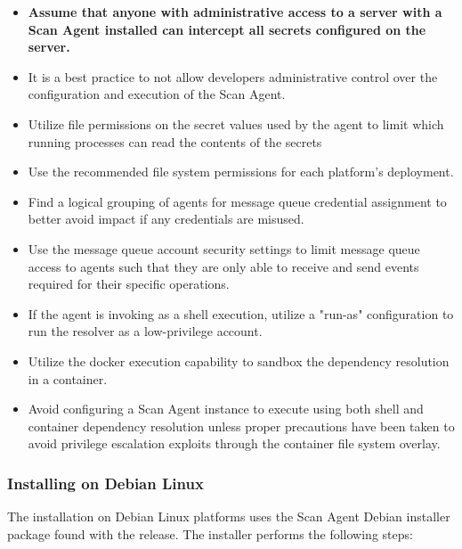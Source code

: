 \begin{itemize}
  \item \textbf{Assume that anyone with administrative access to a server with a Scan Agent installed
    can intercept all secrets configured on the \cxoneflow server.}
  \item It is a best practice to not allow developers administrative control over the configuration and
    execution of the Scan Agent.
  \item Utilize file permissions on the secret values used by the agent to limit which running processes
    can read the contents of the secrets
  \item Use the recommended file system permissions for each platform's deployment.
  \item Find a logical grouping of agents for message queue credential assignment to better avoid
    impact if any credentials are misused.
  \item Use the message queue account security settings to limit message queue access to agents such that they are only
    able to receive and send events required for their specific operations.
  \item If the agent is invoking \scaresolver as a shell execution, utilize a "run-as" configuration to
    run the resolver as a low-privilege account.
  \item Utilize the \scaresolver docker execution capability to sandbox the dependency resolution in a container.
  \item Avoid configuring a Scan Agent instance to execute \scaresolver using both shell and container dependency resolution
    unless proper precautions have been taken to avoid privilege escalation exploits through the container file system overlay.
\end{itemize}


\subsubsection{Installing on Debian Linux}

The installation on Debian Linux platforms uses the Scan Agent Debian installer package
found with the \cxoneflow release.  The installer performs the following steps:

